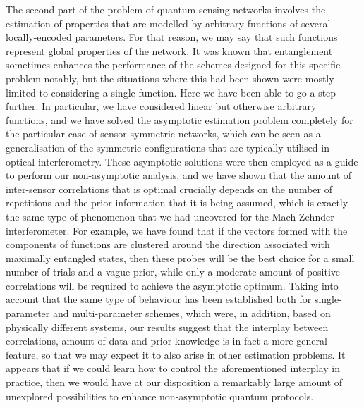 The second part of the problem of quantum sensing networks involves the estimation of properties that are modelled by arbitrary functions of several locally-encoded parameters. For that reason, we may say that such functions represent global properties of the network. It was known that entanglement sometimes enhances the performance of the schemes designed for this specific problem notably, but the situations where this had been shown were mostly limited to considering a single function. Here we have been able to go a step further. In particular, we have considered linear but otherwise arbitrary functions, and we have solved the asymptotic estimation problem completely for the particular case of sensor-symmetric networks, which can be seen as a generalisation of the symmetric configurations that are typically utilised in optical interferometry. These asymptotic solutions were then employed as a guide to perform our non-asymptotic analysis, and we have shown that the amount of inter-sensor correlations that is optimal crucially depends on the number of repetitions and the prior information that it is being assumed, which is exactly the same type of phenomenon that we had uncovered for the Mach-Zehnder interferometer. For example, we have found that if the vectors formed with the components of functions are clustered around the direction associated with maximally entangled states, then these probes will be the best choice for a small number of trials and a vague prior, while only a moderate amount of positive correlations will be required to achieve the asymptotic optimum. Taking into account that the same type of behaviour has been established both for single-parameter and multi-parameter schemes, which were, in addition, based on physically different systems, our results suggest that the interplay between correlations, amount of data and prior knowledge is in fact a more general feature, so that we may expect it to also arise in other estimation problems. It appears that if we could learn how to control the aforementioned interplay in practice, then we would have at our disposition a remarkably large amount of unexplored possibilities to enhance non-asymptotic quantum protocols.

